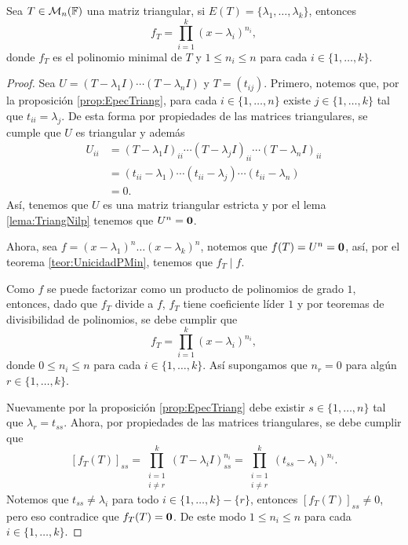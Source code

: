 \begin{teor}\label{teor:MinPolyTriang}
  Sea $T\in\mathcal{M}_n(\mathbb{F})$ una matriz triangular, si $E(T) = \{\lambda_1,\ldots,\lambda_k\}$, entonces
    \[
      f_T = \prod_{i=1}^k (x-\lambda_i)^{n_i},
    \]
  donde $f_T$ es el polinomio minimal de $T$ y $1 \leq n_i \leq n$ para cada $i \in \{1,\ldots,k\}$.
\end{teor}
\begin{proof}
  Sea $U = (T-\lambda_1 I)\cdots(T-\lambda_n I)$ y $T = (t_{ij})$. Primero, notemos que, por la proposición \ref{prop:EpecTriang}, para cada $i \in \{1,\ldots,n\}$ existe $j\in\{1,\ldots,k\}$ tal que $t_{ii} = \lambda_j$. De esta forma por propiedades de las matrices triangulares, se cumple que $U$ es triangular y además
  \begin{align*}
    U_{ii} &= (T-\lambda_1 I)_{ii}\cdots(T-\lambda_j I)_{ii}\cdots(T-\lambda_n I)_{ii}  \\
      &= (t_{ii}-\lambda_1)\cdots(t_{ii}-\lambda_j)\cdots(t_{ii}-\lambda_n)  \\
      &= 0.
  \end{align*}
  Así, tenemos que $U$ es una matriz triangular estricta y por el lema \ref{lema:TriangNilp} tenemos que $U^n = \mathbf{0}$.

  Ahora, sea $f = (x-\lambda_1)^n\ldots(x-\lambda_k)^n$, notemos que $f(T) = U^n = \mathbf{0}$, así, por el teorema \ref{teor:UnicidadPMin}, tenemos que $f_T \mid f$.
  
  Como $f$ se puede factorizar como un producto de polinomios de grado $1$, entonces, dado que $f_T$ divide a $f$, $f_T$ tiene coeficiente líder $1$ y por teoremas de divisibilidad de polinomios, se debe cumplir que
    \[
      f_T = \prod_{i=1}^k (x-\lambda_i)^{n_i},
    \]
donde $0 \leq n_i \leq n$ para cada $i \in \{1,\ldots,k\}$. Así supongamos que $n_r = 0$ para algún $r \in \{1,\ldots,k\}$.

Nuevamente por la proposición \ref{prop:EpecTriang} debe existir $s \in \{1,\ldots,n\}$ tal que $\lambda_r = t_{ss}$. Ahora, por propiedades de las matrices triangulares, se debe cumplir que
  \[
    [f_T(T)]_{ss} 
      = \prod_{\substack{i=1\\i\neq r}}^k (T-\lambda_i I)_{ss}^{n_i} 
      = \prod_{\substack{i=1\\i\neq r}}^k (t_{ss}-\lambda_i)^{n_i}.
  \]
Notemos que $t_{ss} \neq \lambda_i$ para todo $i \in \{1,\ldots,k\}-\{r\}$, entonces $[f_T(T)]_{ss} \neq 0$, pero eso contradice que $f_T(T) = \mathbf{0}$. De este modo $1 \leq n_i \leq n$ para cada $i \in \{1,\ldots,k\}$.
\end{proof}

